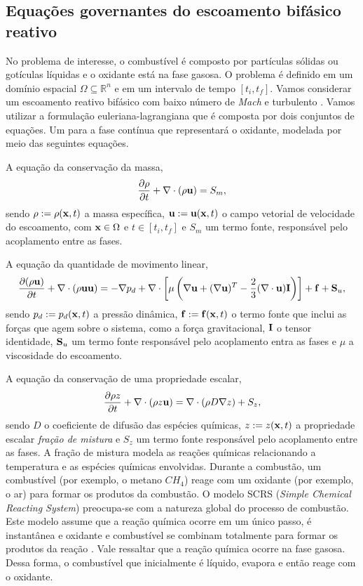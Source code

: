 \documentclass[12pt, brazil]{article}
\begin{document}
\subsection{Equações governantes do escoamento bifásico reativo}

No problema de interesse, o combustível é composto por partículas sólidas ou gotículas líquidas e o oxidante está na fase gasosa. O problema é definido em um domínio espacial $\Omega\subseteq\mathbb{R}^n$ e em um intervalo de tempo $[t_i,t_f]$. Vamos considerar um escoamento reativo bifásico com baixo número de {\it Mach} e turbulento \cite{FER03,KUO05,POI05,VER07}. Vamos utilizar a formulação euleriana-lagrangiana que é composta por dois conjuntos de equações. Um para a fase contínua que representará o oxidante, modelada por meio das seguintes equações. 

A equação da conservação da massa,
\begin{equation}
\label{s1.eq1}
\dfrac{\partial \rho}{\partial t} + \nabla\cdot (\rho{\bf u}) = S_m,
\end{equation}
sendo $\rho:=\rho({\bf x},t)$ a massa específica, $\mathbf{u}:=\mathbf{u}({\bf x},t)$ o campo vetorial de velocidade do escoamento, com ${\bf x}\in\Omega$ e $t\in[t_i,t_f]$ e $S_m$ um termo fonte, responsável pelo acoplamento entre as fases.

A equação da quantidade de movimento linear,
\begin{equation}
\label{s1.eq2}
\dfrac{\partial (\rho {\bf u})}{\partial t} + \nabla\cdot(\rho{\bf u}{\bf u}) = -\nabla p_d + \nabla\cdot\left[\mu\left(\nabla {\bf u} + (\nabla {\bf u})^T - \dfrac{2}{3}(\nabla\cdot{\bf u}){\bf I}\right)\right] + {\bf f} + {\bf S}_u,
\end{equation}
sendo $p_d:=p_d({\bf x},t)$ a pressão dinâmica, $\mathbf{f}:={\bf f}({\bf x},t)$ o termo fonte que inclui as forças que agem sobre o sistema, como a força gravitacional, ${\bf I}$ o tensor identidade, ${\bf S}_u$ um termo fonte responsável pelo acoplamento entra as fases e $\mu$ a viscosidade do escoamento.

A equação da conservação de uma propriedade escalar, 
\begin{equation}
\label{s1.eq3}
\dfrac{\partial \rho z}{\partial t} + \nabla\cdot(\rho z{\bf u}) = \nabla\cdot \left(\rho D\nabla z\right) + S_z,
\end{equation}
sendo $D$ o coeficiente de difusão das espécies químicas, $z:=z({\bf x},t)$ a propriedade escalar {\em fração de mistura} e $S_z$ um termo fonte responsável pelo acoplamento entre as fases. A  fração de mistura modela as reações químicas relacionando a temperatura e as espécies químicas envolvidas. Durante a combustão, um combustível (por exemplo, o metano $CH_4$) reage com um oxidante (por exemplo, o ar) para formar os produtos da combustão. O modelo SCRS ({\it Simple Chemical Reacting System}) preocupa-se com a natureza global do processo de combustão. Este modelo assume que a reação química ocorre em um único passo, é instantânea e oxidante e combustível se combinam totalmente para formar os produtos da reação \cite{KUO05,POI05,VER07}. Vale ressaltar que a reação química ocorre na fase gasosa. Dessa forma, o combustível que inicialmente é líquido, evapora e então reage com o oxidante.
\end{document}
